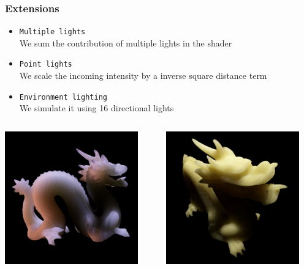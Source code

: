 \documentclass{beamer}
\begin{document}
\begin{frame}
    \frametitle{Extensions}
\begin{itemize}
\vspace{0.4cm}
	\item \texttt{Multiple lights} \\ We sum the contribution of multiple lights in the shader
	\item \texttt{Point lights} \\ We scale the incoming intensity by a inverse square distance term	
	\item \texttt{Environment lighting} \\ We simulate it using 16 directional lights
\end{itemize}
\begin{columns}
    \begin{column}{0.33\textwidth}
      \centering
		\includegraphics[width=0.9\textwidth]{multiple}
				\end{column}
   \begin{column}{0.33\textwidth}
      \centering
		\includegraphics[width=0.9\textwidth]{point}

\end{column}
\end{columns}
\end{frame}
\end{document}
